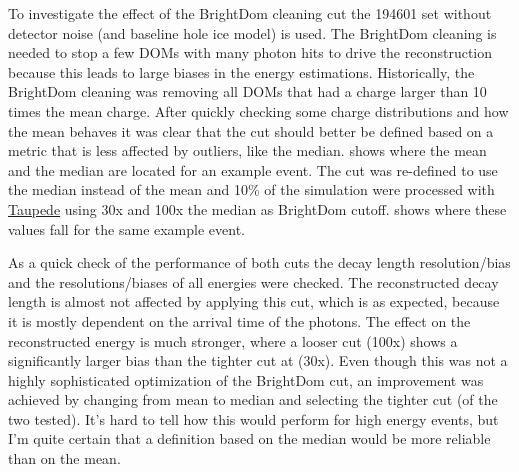 To investigate the effect of the BrightDom cleaning cut the 194601 set without detector noise (and baseline hole ice model) is used. The BrightDom cleaning is needed to stop a few DOMs with many photon hits to drive the reconstruction because this leads to large biases in the energy estimations. Historically, the BrightDom cleaning was removing all DOMs that had a charge larger than 10 times the mean charge. After quickly checking some charge distributions and how the mean behaves it was clear that the cut should better be defined based on a metric that is less affected by outliers, like the median.  shows where the mean and the median are located for an example event. The cut was re-defined to use the median instead of the mean and 10\% of the simulation were processed with \href{https://github.com/LeanderFischer/I3_HNL_Decay/blob/a6838ec48e0a2d4f6547cbe064d2928ec55fb76d/submission_scripts/process/process_Taupede.py}{Taupede} using 30x and 100x the median as BrightDom cutoff.  shows where these values fall for the same example event.


As a quick check of the performance of both cuts the decay length resolution/bias and the resolutions/biases of all energies were checked. The reconstructed decay length is almost not affected by applying this cut, which is as expected, because it is mostly dependent on the arrival time of the photons. The effect on the reconstructed energy is much stronger, where a looser cut (100x) shows a significantly larger bias than the tighter cut at (30x). Even though this was not a highly sophisticated optimization of the BrightDom cut, an improvement was achieved by changing from mean to median and selecting the tighter cut (of the two tested). It's hard to tell how this would perform for high energy events, but I'm quite certain that a definition based on the median would be more reliable than on the mean.

